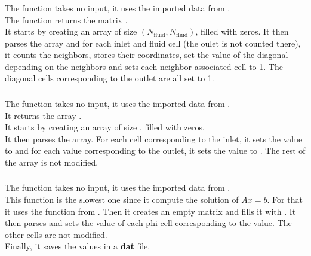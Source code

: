 \subsubsection{\textcolor{func}{}}
The function \textcolor{func}{} takes no input, it uses the imported data from
.\\
The function returns the matrix .\\
It starts by creating an array  of size
$(N_{\text{fluid}}, N_{\text{fluid}})$, filled with zeros. It then
parses the array  and for each inlet and fluid cell (the oulet
is not counted there), it counts the neighbors, stores their coordinates,
set the value of the diagonal depending on the neighbors and sets each
neighbor associated cell to 1. The diagonal cells corresponding to the outlet
are all set to 1.

\subsubsection{\textcolor{func}{}}
The function \textcolor{func}{} takes no input, it uses the
imported data from .\\
It returns the array .\\
It starts by creating an array  of size
, filled with zeros.\\
It then parses the array. For each cell corresponding to the inlet, it sets the
value to  and for each value corresponding to the outlet, it sets
the value to . The rest of the array is not modified.

\subsubsection{\textcolor{func}{}}
The function \textcolor{func}{} takes no input, it uses the
imported data from .\\
This function is the slowest one since it compute the solution of $Ax = b$. For
that it uses the function  from . Then it creates
an empty matrix  and fills it with . It then parses
 and sets the value of each phi cell corresponding to the  value.
The other cells are not modified.\\
Finally, it saves the values in a \textbf{dat} file.

